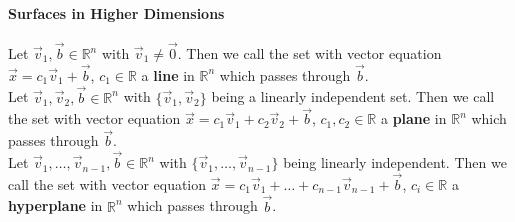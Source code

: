 \documentclass[10pt,letter]{article}
\begin{document}
\paragraph{Surfaces in Higher Dimensions} Let $\vec{v}_1,\vec{b}\in\mathbb{R}^n$ with $\vec{v}_1\neq\vec{0}$. Then we call the set with vector equation $\vec{x}=c_1\vec{v}_1+\vec{b}$, $c_1\in\mathbb{R}$ a \textbf{line} in $\mathbb{R}^n$ which passes through $\vec{b}$. \\ 
Let $\vec{v}_1,\vec{v}_2,\vec{b}\in\mathbb{R}^n$ with $\{\vec{v}_1,\vec{v}_2\}$ being a linearly independent set. Then we call the set with vector equation $\vec{x}=c_1\vec{v}_1+c_2\vec{v}_2+\vec{b}$, $c_1,c_2\in\mathbb{R}$ a \textbf{plane} in $\mathbb{R}^n$ which passes through $\vec{b}$. \\ 
Let $\vec{v}_1,\ldots,\vec{v}_{n-1},\vec{b}\in\mathbb{R}^n$ with $\{\vec{v}_1,\ldots,\vec{v}_{n-1}\}$ being linearly independent. Then we call the set with vector equation $\vec{x}=c_1\vec{v}_1+\ldots+c_{n-1}\vec{v}_{n-1}+\vec{b}$, $c_i\in\mathbb{R}$ a \textbf{hyperplane} in $\mathbb{R}^n$ which passes through $\vec{b}$. 
\end{document}
